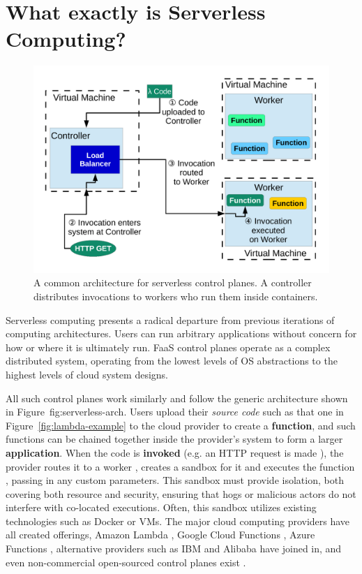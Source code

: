 \section{What exactly is Serverless Computing?}
\label{sec:serverless-computing}

\begin{figure}
  \begin{center}
    \includegraphics[width=.6\columnwidth]{./figures/sys-diag.pdf}
  \caption{A common architecture for serverless control planes. 
          A controller distributes invocations to workers who run them inside containers.}
  \label{fig:serverless-arch}
\end{center}
\end{figure}

Serverless computing presents a radical departure from previous iterations of computing architectures.
Users can run arbitrary applications without concern for how or where it is ultimately run.
FaaS control planes operate as a complex distributed system, operating from the lowest levels of OS abstractions to the highest levels of cloud system designs.

All such control planes work similarly and follow the generic architecture shown in Figure~{fig:serverless-arch}.
Users upload their \textit{source code}  such as that one in Figure~\ref{fig:lambda-example} to the cloud provider to create a \textbf{function}, and such functions can be chained together inside the provider's system to form a larger \textbf{application}.
When the code is \textbf{invoked} (e.g. an HTTP request is made ), the provider routes it to a worker , creates a sandbox for it and executes the function , passing in any custom parameters.
This sandbox must provide isolation, both covering both resource and security, ensuring that hogs or malicious actors do not interfere with co-located executions.
Often, this sandbox utilizes existing technologies such as Docker \cite{docker-main} or VMs.
The major cloud computing providers have all created offerings, Amazon Lambda \cite{lambda}, Google Cloud Functions \cite{gcp-functions}, Azure Functions \cite{azure-functions}, alternative providers such as IBM \cite{openwhisk} and Alibaba \cite{alibaba-compute} have joined in, and even non-commercial open-sourced control planes exist \cite{hendrickson2016serverless,openfaas}.

